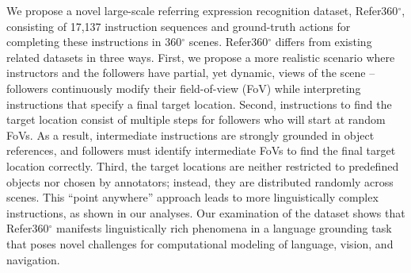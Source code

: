 We propose a novel large-scale referring expression recognition dataset, Refer360$^{\circ}$, consisting of 17,137 instruction sequences and ground-truth actions for completing these instructions in 360$^{\circ}$ scenes. Refer360$^{\circ}$ differs from existing related datasets in three ways. First, we propose a more realistic scenario where instructors and the followers have partial, yet dynamic, views of the scene – followers continuously modify their field-of-view (FoV) while interpreting instructions that specify a final target location. Second, instructions to find the target location consist of multiple steps for followers who will start at random FoVs. As a result, intermediate instructions are strongly grounded in object references, and followers must identify intermediate FoVs to find the final target location correctly. Third, the target locations are neither restricted to predefined objects nor chosen by annotators; instead, they are distributed randomly across scenes. This ``point anywhere'' approach leads to more linguistically complex instructions, as shown in our analyses. Our examination of the dataset shows that Refer360$^{\circ}$ manifests linguistically rich phenomena in a language grounding task that poses novel challenges for computational modeling of language, vision, and navigation.
